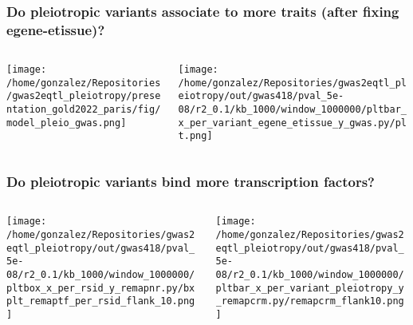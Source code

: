 \documentclass{beamer}
\begin{document}
\begin{frame}
\frametitle{Do pleiotropic variants associate to more traits (after fixing egene-etissue)?}

\begin{columns}
\begin{column}{0.5\textwidth}
    \begin{center}
\texttt{[image: /home/gonzalez/Repositories/gwas2eqtl\_pleiotropy/presentation\_gold2022\_paris/fig/model\_pleio\_gwas.png]}
     \end{center}
\end{column}
\begin{column}{0.5\textwidth}  %
    \begin{center}
\texttt{[image: /home/gonzalez/Repositories/gwas2eqtl\_pleiotropy/out/gwas418/pval\_5e-08/r2\_0.1/kb\_1000/window\_1000000/pltbar\_x\_per\_variant\_egene\_etissue\_y\_gwas.py/plt.png]}
     \end{center}
\end{column}
\end{columns}

\end{frame}

\begin{frame}
\frametitle{Do pleiotropic variants bind more transcription factors?}

\begin{columns}
\begin{column}{0.5\textwidth}
    \begin{center}
\texttt{[image: /home/gonzalez/Repositories/gwas2eqtl\_pleiotropy/out/gwas418/pval\_5e-08/r2\_0.1/kb\_1000/window\_1000000/pltbox\_x\_per\_rsid\_y\_remapnr.py/bxplt\_remaptf\_per\_rsid\_flank\_10.png]}
     \end{center}
\end{column}
\begin{column}{0.5\textwidth}  %
    \begin{center}
\texttt{[image: /home/gonzalez/Repositories/gwas2eqtl\_pleiotropy/out/gwas418/pval\_5e-08/r2\_0.1/kb\_1000/window\_1000000/pltbar\_x\_per\_variant\_pleiotropy\_y\_remapcrm.py/remapcrm\_flank10.png]}
     \end{center}
\end{column}
\end{columns}

\end{frame}
\end{document}
